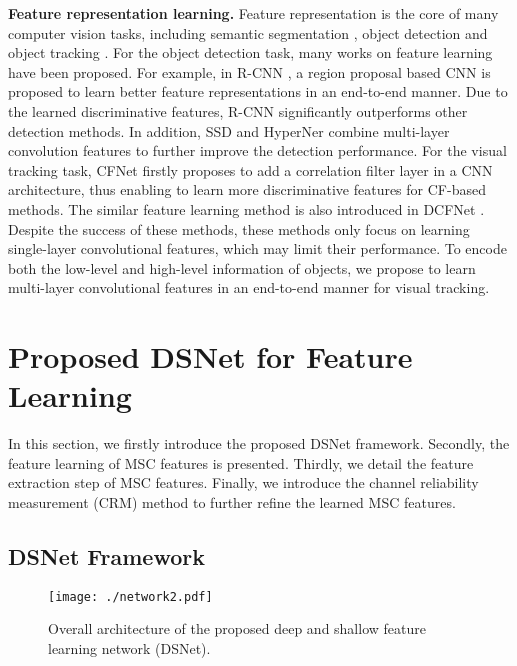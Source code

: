 \documentclass[runningheads]{llncs}
\begin{document}
\noindent \textbf{Feature representation learning.} Feature representation is the core of many computer vision tasks, including semantic segmentation \cite{Deconv}, object detection \cite{YOLO} and object tracking \cite{Staple}. For the object detection task, many works on feature learning have been proposed. For example, in R-CNN \cite{R-CNN}, a region proposal based CNN is proposed to learn better feature representations in an end-to-end manner. Due to the learned discriminative features, R-CNN significantly outperforms other detection methods. In addition, SSD \cite{SSD} and HyperNer \cite{HyperNet} combine multi-layer convolution features to further improve the detection performance. For the visual tracking task, CFNet \cite{CFNet} firstly proposes to add a correlation filter layer in a CNN architecture, thus enabling to learn more discriminative features for CF-based methods. The similar feature learning method is also introduced in DCFNet \cite{DCFNet}. Despite the success of these methods, these methods only focus on learning single-layer convolutional features, which may limit their performance. To encode both the low-level and high-level information of objects, we propose to learn multi-layer convolutional features in an end-to-end manner for visual tracking. 

\section{Proposed DSNet for Feature Learning}
In this section, we firstly introduce the proposed DSNet framework. Secondly, the feature learning of MSC features is presented. Thirdly, we detail the feature extraction step of MSC features. Finally, we introduce the  channel reliability measurement (CRM) method to further refine the learned MSC features.


\subsection{DSNet Framework} %
\begin{figure*}[!tp]
\begin{center}
   \texttt{[image: ./network2.pdf]} %
\end{center}
 \caption{Overall architecture of the proposed deep and shallow feature learning network (DSNet).}
\label{network}
\end{figure*}
\end{document}
